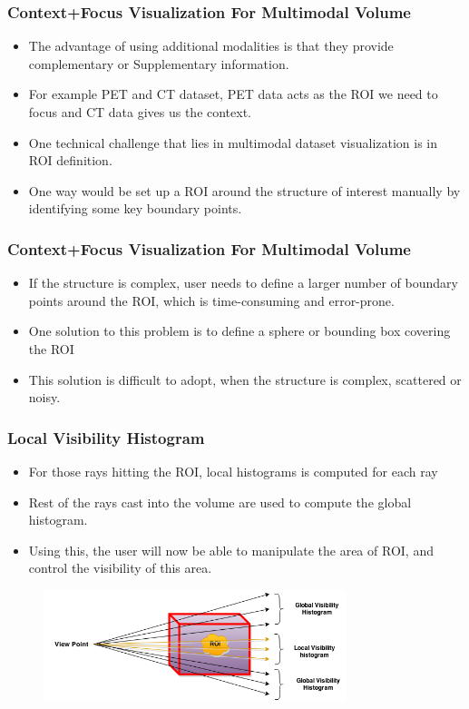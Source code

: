 \documentclass{beamer}
\begin{document}
\begin{frame}
\frametitle{Context+Focus Visualization For Multimodal Volume}
\begin{itemize}
\item The advantage of using additional modalities is that they provide complementary or Supplementary information.
\item For example PET and CT dataset, PET data acts as the ROI we need to focus and CT data gives us the context.
\item One technical challenge that lies in multimodal dataset visualization is in ROI definition. 
\item One way would be set up a ROI around the structure of interest manually
by identifying some key boundary points.
\end{itemize}
\end{frame}



\begin{frame}
\frametitle{Context+Focus Visualization For Multimodal Volume}
\begin{itemize}
 
\item If the structure is complex, user needs to define a larger number of boundary points around the ROI, which is time-consuming and error-prone. 
\item One solution to this problem is to define a sphere or bounding box covering the ROI
\item This solution is difficult to adopt, when the structure is complex, scattered or noisy.
\end{itemize}
\end{frame}




\begin{frame}
\frametitle{Local Visibility Histogram}
\begin{itemize}
\item For those rays hitting the ROI, local histograms is computed for each ray
\item Rest of the rays cast into the volume are used to compute the global
histogram.
\item Using this, the user will now be able to manipulate the area of ROI, and
control the visibility of this area.
\end{itemize}
\begin{figure}
\centering
\includegraphics[width=250pt]{pet-ct-roi.png}
\end{figure}
\end{frame}
\end{document}
